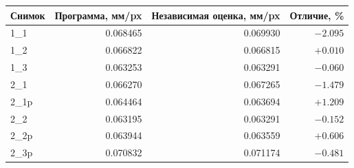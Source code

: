 \begin{tabular}{@{}lrrr@{}}
\toprule
Снимок & Программа, мм/px & Независимая оценка, мм/px & Отличие, \% \\
\midrule
1\_1 & \num{0.068465} & \num{0.069930} & $-\num{2.095}$ \\
1\_2 & \num{0.066822} & \num{0.066815} & $+\num{0.010}$ \\
1\_3 & \num{0.063253} & \num{0.063291} & $-\num{0.060}$ \\
2\_1 & \num{0.066270} & \num{0.067265} & $-\num{1.479}$ \\
2\_1p & \num{0.064464} & \num{0.063694} & $+\num{1.209}$ \\
2\_2 & \num{0.063195} & \num{0.063291} & $-\num{0.152}$ \\
2\_2p & \num{0.063944} & \num{0.063559} & $+\num{0.606}$ \\
2\_3p & \num{0.070832} & \num{0.071174} & $-\num{0.481}$ \\
\bottomrule
\end{tabular}
